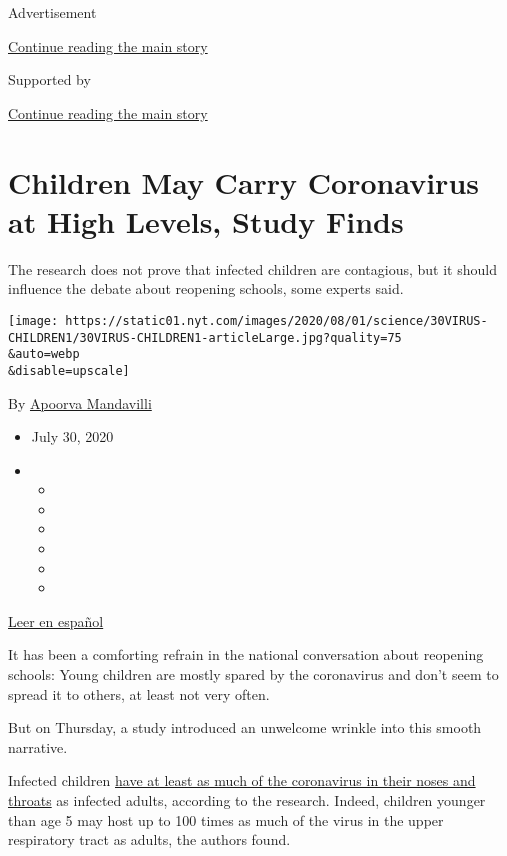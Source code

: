 Advertisement

\protect\hyperlink{after-top}{Continue reading the main story}

Supported by

\protect\hyperlink{after-sponsor}{Continue reading the main story}

\hypertarget{children-may-carry-coronavirus-at-high-levels-study-finds}{%
\section{Children May Carry Coronavirus at High Levels, Study
Finds}\label{children-may-carry-coronavirus-at-high-levels-study-finds}}

The research does not prove that infected children are contagious, but
it should influence the debate about reopening schools, some experts
said.

\texttt{[image: https://static01.nyt.com/images/2020/08/01/science/30VIRUS-CHILDREN1/30VIRUS-CHILDREN1-articleLarge.jpg?quality=75\\\&auto=webp\\\&disable=upscale]}

By \href{https://www.nytimes.com/by/apoorva-mandavilli}{Apoorva
Mandavilli}

\begin{itemize}
\item
  July 30, 2020
\item
  \begin{itemize}
  \item
  \item
  \item
  \item
  \item
  \item
  \end{itemize}
\end{itemize}

\href{https://www.nytimes.com/es/2020/07/31/espanol/ciencia-y-tecnologia/ninos-contagio-coronavirus.html}{Leer
en español}

It has been a comforting refrain in the national conversation about
reopening schools: Young children are mostly spared by the coronavirus
and don't seem to spread it to others, at least not very often.

But on Thursday, a study introduced an unwelcome wrinkle into this
smooth narrative.

Infected children
\href{https://jamanetwork.com/journals/jamapediatrics/fullarticle/2768952}{have
at least as much of the coronavirus in their noses and throats} as
infected adults, according to the research. Indeed, children younger
than age 5 may host up to 100 times as much of the virus in the upper
respiratory tract as adults, the authors found.

